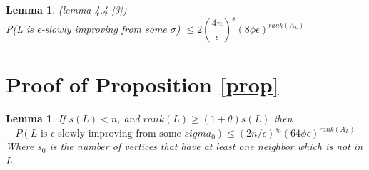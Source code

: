 \documentclass[12pt]{article}
\newtheorem{lemma}[theorem]{Lemma}
\begin{document}
\begin{lemma}(lemma 4.4 [3])\\
\label{bound}
P(L is $\epsilon$-slowly improving from some $\sigma$) $\leq 2 (\dfrac{4n}{\epsilon})^s (8\phi \epsilon)^{rank(A_L)}$

\end{lemma}


\section{Proof of Proposition \ref{prop}}

\begin{lemma}
\label{boundN}
If $s(L) < n$, and $rank(L) \geq (1+\theta)s(L)$ then \\
\begin{equation*}
P(L \text{ is }\epsilon\text{-slowly improving from some }sigma_0)  \leq (2n/\epsilon)^{s_0}(64\phi\epsilon)^{rank(A_L)}
\end{equation*}
Where $s_0$ is the number of vertices that have at least one neighbor which is not in L. 
\end{lemma}
\end{document}
